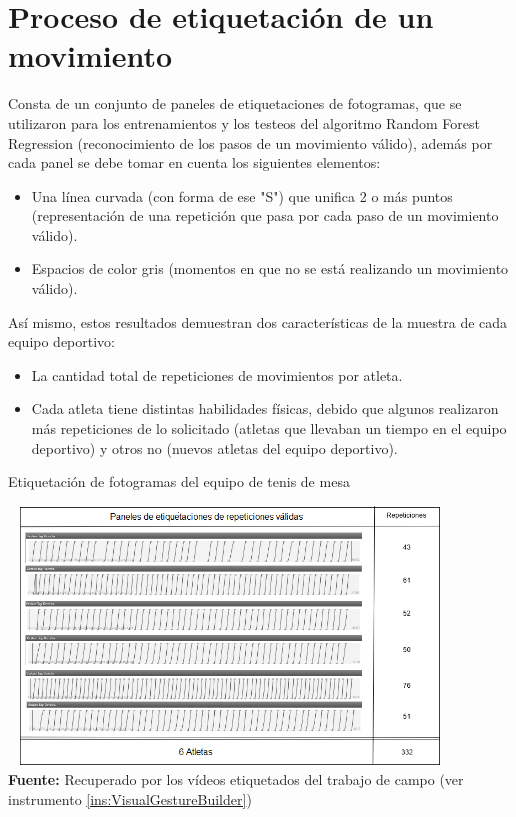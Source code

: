 \section{Proceso de etiquetaci\'on de un movimiento}
Consta de un conjunto de paneles de etiquetaciones de fotogramas, que se utilizaron para los entrenamientos y los testeos del algoritmo Random Forest Regression (reconocimiento de los pasos de un movimiento v\'alido), adem\'as por cada panel se debe tomar en cuenta los  siguientes elementos:
\begin{itemize}
\item Una l\'inea curvada (con forma de ese "S") que unifica 2 o m\'as puntos (representaci\'on de una repetici\'on que pasa por cada paso de un  movimiento v\'alido).
\item Espacios de color gris (momentos en que no se est\'a realizando un movimiento v\'alido).
\end{itemize}
As\'i mismo, estos resultados demuestran dos caracter\'isticas de la muestra de cada equipo deportivo:
\begin{itemize}
\item  La cantidad total de repeticiones de movimientos por atleta.
\item Cada atleta tiene distintas habilidades f\'isicas, debido que algunos realizaron m\'as repeticiones de lo solicitado (atletas que llevaban un tiempo en el equipo deportivo) y otros no (nuevos atletas del equipo deportivo).
\end{itemize}
\begin{table}[H]
	\caption{Etiquetaci\'on de fotogramas del equipo de tenis de mesa}
	\label{fig:etiquetaTenis}
	\centering
	\includegraphics[width=445px,height=260px]{graphics/resultados/GraSegTenisDeMesa.PNG} \\
	\textbf{Fuente:} Recuperado por los v\'ideos etiquetados del trabajo de campo (ver instrumento \ref{ins:VisualGestureBuilder})
\end{table}
